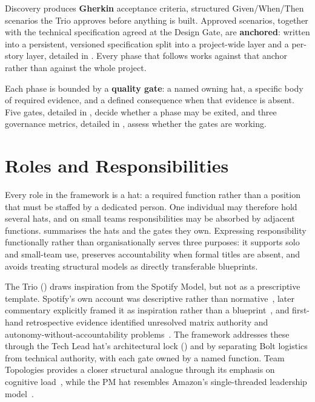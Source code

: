 Discovery produces \textbf{Gherkin} acceptance criteria, structured Given/When/Then scenarios the Trio approves before anything is built. Approved scenarios, together with the technical specification agreed at the Design Gate, are \textbf{anchored}: written into a persistent, versioned specification split into a project-wide layer and a per-story layer, detailed in . Every phase that follows works against that anchor rather than against the whole project.

Each phase is bounded by a \textbf{quality gate}: a named owning hat, a specific body of required evidence, and a defined consequence when that evidence is absent. Five gates, detailed in , decide whether a phase may be exited, and three governance metrics, detailed in , assess whether the gates are working.

\section{Roles and Responsibilities}
\label{sec:roles}


Every role in the framework is a hat: a required function rather than a position that must be staffed by a dedicated person. One individual may therefore hold several hats, and on small teams responsibilities may be absorbed by adjacent functions.  summarises the hats and the gates they own. Expressing responsibility functionally rather than organisationally serves three purposes: it supports solo and small-team use, preserves accountability when formal titles are absent, and avoids treating structural models as directly transferable blueprints.

The Trio () draws inspiration from the Spotify Model, but not as a prescriptive template. Spotify's own account was descriptive rather than normative~\cite{Kniberg:2012sp}, later commentary explicitly framed it as inspiration rather than a blueprint~\cite{LeadingComplexity:2023sp}, and first-hand retrospective evidence identified unresolved matrix authority and autonomy-without-accountability problems~\cite{Lee:2020sq}. The framework addresses these through the Tech Lead hat's architectural lock () and by separating Bolt logistics from technical authority, with each gate owned by a named function. Team Topologies provides a closer structural analogue through its emphasis on cognitive load~\cite{Skelton:2019tt}, while the \ac{PM} hat resembles Amazon's single-threaded leadership model~\cite{Bryar:2021wb}.


